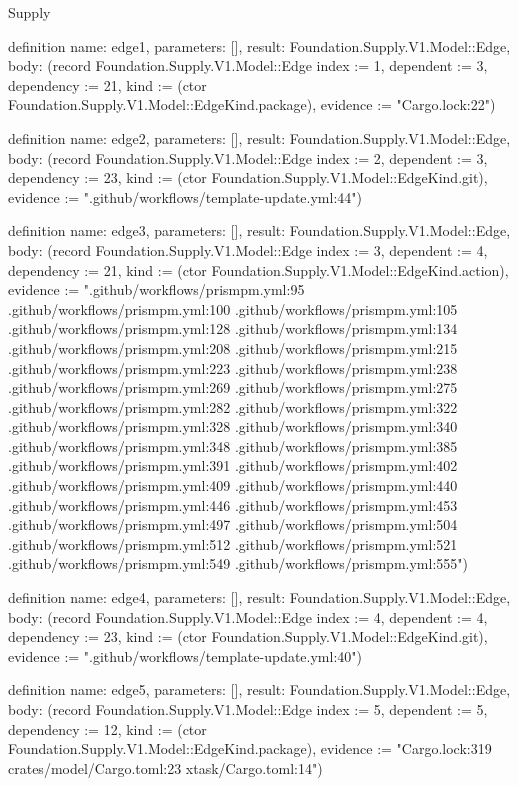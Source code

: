 \begin{lexlean}{Supply}
\begin{semanticmodule}
definition{
  name: edge1,
  parameters: [],
  result: Foundation.Supply.V1.Model::Edge,
  body: (record Foundation.Supply.V1.Model::Edge {index := 1, dependent := 3, dependency := 21, kind := (ctor Foundation.Supply.V1.Model::EdgeKind.package), evidence := "Cargo.lock:22"})
}

definition{
  name: edge2,
  parameters: [],
  result: Foundation.Supply.V1.Model::Edge,
  body: (record Foundation.Supply.V1.Model::Edge {index := 2, dependent := 3, dependency := 23, kind := (ctor Foundation.Supply.V1.Model::EdgeKind.git), evidence := ".github/workflows/template-update.yml:44"})
}

definition{
  name: edge3,
  parameters: [],
  result: Foundation.Supply.V1.Model::Edge,
  body: (record Foundation.Supply.V1.Model::Edge {index := 3, dependent := 4, dependency := 21, kind := (ctor Foundation.Supply.V1.Model::EdgeKind.action), evidence := ".github/workflows/prismpm.yml:95 .github/workflows/prismpm.yml:100 .github/workflows/prismpm.yml:105 .github/workflows/prismpm.yml:128 .github/workflows/prismpm.yml:134 .github/workflows/prismpm.yml:208 .github/workflows/prismpm.yml:215 .github/workflows/prismpm.yml:223 .github/workflows/prismpm.yml:238 .github/workflows/prismpm.yml:269 .github/workflows/prismpm.yml:275 .github/workflows/prismpm.yml:282 .github/workflows/prismpm.yml:322 .github/workflows/prismpm.yml:328 .github/workflows/prismpm.yml:340 .github/workflows/prismpm.yml:348 .github/workflows/prismpm.yml:385 .github/workflows/prismpm.yml:391 .github/workflows/prismpm.yml:402 .github/workflows/prismpm.yml:409 .github/workflows/prismpm.yml:440 .github/workflows/prismpm.yml:446 .github/workflows/prismpm.yml:453 .github/workflows/prismpm.yml:497 .github/workflows/prismpm.yml:504 .github/workflows/prismpm.yml:512 .github/workflows/prismpm.yml:521 .github/workflows/prismpm.yml:549 .github/workflows/prismpm.yml:555"})
}

definition{
  name: edge4,
  parameters: [],
  result: Foundation.Supply.V1.Model::Edge,
  body: (record Foundation.Supply.V1.Model::Edge {index := 4, dependent := 4, dependency := 23, kind := (ctor Foundation.Supply.V1.Model::EdgeKind.git), evidence := ".github/workflows/template-update.yml:40"})
}

definition{
  name: edge5,
  parameters: [],
  result: Foundation.Supply.V1.Model::Edge,
  body: (record Foundation.Supply.V1.Model::Edge {index := 5, dependent := 5, dependency := 12, kind := (ctor Foundation.Supply.V1.Model::EdgeKind.package), evidence := "Cargo.lock:319 crates/model/Cargo.toml:23 xtask/Cargo.toml:14"})
}


\end{semanticmodule}
\end{lexlean}
